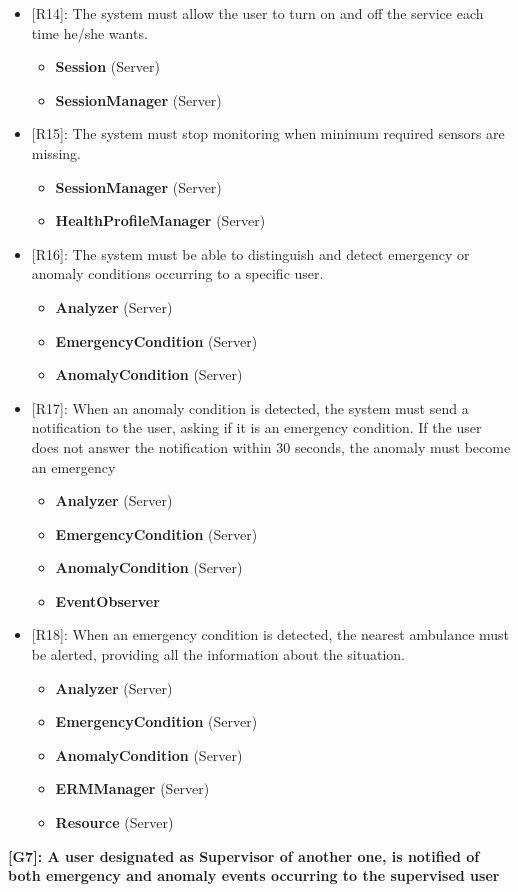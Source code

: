 \begin{itemize}
	\item {[R14]: The system must allow the user to turn on and off the service each time he/she wants.}
	\begin{itemize}
		\item {\textbf{Session} (Server)}
		\item {\textbf{SessionManager} (Server)}
	\end{itemize}   
	\item {[R15]: The system must stop monitoring when minimum required sensors are missing.}
	\begin{itemize}
		\item {\textbf{SessionManager} (Server)}
		\item {\textbf{HealthProfileManager} (Server)}
	\end{itemize}   
	\item {[R16]: The system must be able to distinguish and detect emergency or anomaly conditions occurring to a specific user.}
	\begin{itemize}
		\item {\textbf{Analyzer} (Server)}
		\item {\textbf{EmergencyCondition} (Server)}
		\item {\textbf{AnomalyCondition} (Server)}
	\end{itemize}   
	\item {[R17]: When an anomaly condition is detected, the system must send a notification to the user, asking if it is an emergency condition. If the user does not answer the notification within 30 seconds, the anomaly must become an emergency }
	\begin{itemize}
		\item {\textbf{Analyzer} (Server)}
		\item {\textbf{EmergencyCondition} (Server)}
		\item {\textbf{AnomalyCondition} (Server)}
		\item {\textbf{EventObserver}}
	\end{itemize}   
	\item {[R18]: When an emergency condition is detected, the nearest ambulance must be alerted, providing all the information about the situation.}
	\begin{itemize}
		\item {\textbf{Analyzer} (Server)}
		\item {\textbf{EmergencyCondition} (Server)}
		\item {\textbf{AnomalyCondition} (Server)}
		\item {\textbf{ERMManager} (Server)}
		\item {\textbf{Resource} (Server)}
	\end{itemize}   
\end{itemize}
\raggedbottom
\textbf{[G7]: A user designated as Supervisor of another one, is notified of both emergency and anomaly events occurring to the supervised user}

